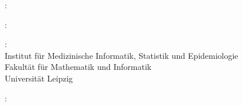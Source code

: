 \thispagestyle{empty}

\hfill

\vfill

\noindent{}: \\
\myName{} %

\medskip

\noindent{}: \\
\emph{\myTitle}

\medskip

\noindent{}: \\
Institut für Medizinische Informatik, Statistik und Epidemiologie \\
Fakultät für Mathematik und Informatik \\
Universität Leipzig

\medskip

\noindent{}: \\
\myProf \\
\mySupervisor

\medskip

